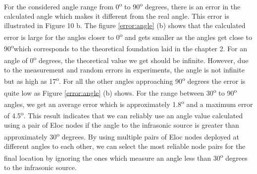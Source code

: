 \documentclass[12pt]{article}
\numberwithin{figure}{section}
\numberwithin{table}{section}
\begin{document}
\paragraph{}
For the considered angle range
from 0\textsuperscript{o} to 90\textsuperscript{o} degrees, there is an error in the calculated angle which makes it different from the real angle. This error is illustrated in Figure 10 b. The figure \ref{error:angle} (b) shows that the calculated error is large for the angles closer to 0\textsuperscript{o} and gets smaller as the angles get close to 90\textsuperscript{o}which corresponds to the theoretical foundation laid in the chapter 2. For an angle of 0\textsuperscript{o} degrees, the theoretical value we get should be infinite. However, due to the measurement and random errors in experiments, the angle is not infinite but as high as 17\textsuperscript{o}. For all the other angles approaching 90\textsuperscript{o} degrees the error is quite low as Figure  \ref{error:angle} (b) shows. For the range between 30\textsuperscript{o} to 90\textsuperscript{o} angles, we get an average error which is approximately 1.8\textsuperscript{o} and a maximum error of 4.5\textsuperscript{o}. This result indicates that we can reliably use an angle value calculated using a pair of Eloc nodes if the angle to the infrasonic source is greater than approximately 30\textsuperscript{o} degrees. By using multiple pairs of Eloc nodes deployed at different angles to each other, we can select the most reliable node pairs for the final location by ignoring the ones which measure an angle less than 30\textsuperscript{o} degrees to the infrasonic source. 
\end{document}
